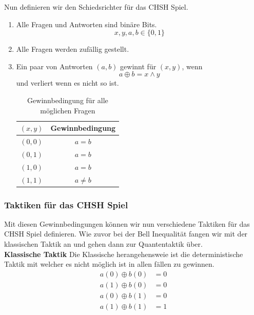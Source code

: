 Nun definieren wir den Schiedsrichter für das CHSH Spiel.
\begin{enumerate}
    \item Alle Fragen und Antworten sind binäre Bits.
    \begin{equation}
        x, y, a, b \in \{0, 1\}
    \end{equation}
    \item Alle Fragen werden zufällig gestellt.
    \item Ein paar von Antworten $(a, b)$ gewinnt für $(x, y)$, wenn
    \begin{equation}
        a \oplus b = x \land y
    \end{equation}
    und verliert wenn es nicht so ist.
    \begin{table}[H]
        \centering
        \begin{tabular}{c|c}
            $(x, y)$ & Gewinnbedingung \\ \hline
            $(0, 0)$ & $a = b$ \\ \hline
            $(0, 1)$ & $a = b$ \\ \hline
            $(1, 0)$ & $a = b$ \\ \hline
            $(1, 1)$ & $a \neq b$ \\
        \end{tabular}
        \caption{Gewinnbedingung für alle möglichen Fragen}
        \label{tab:CHSHWinCondition}
    \end{table}
\end{enumerate}

\subsubsection{Taktiken für das CHSH Spiel}
\label{subsubsec:chsh_taktiken}

Mit diesen Gewinnbedingungen können wir nun verschiedene Taktiken für das CHSH Spiel definieren.
Wie zuvor bei der Bell Inequalität fangen wir mit der klassischen Taktik an und gehen dann zur Quantentaktik über.\\

\textbf{Klassische Taktik}
Die Klassische herangehensweie ist die deterministische Taktik mit welcher es nicht möglich ist in allen fällen zu gewinnen.
\begin{align}
    a(0) \oplus b(0) &= 0 \\
    a(1) \oplus b(0) &= 0 \\
    a(0) \oplus b(1) &= 0 \\
    a(1) \oplus b(1) &= 1
\end{align}

